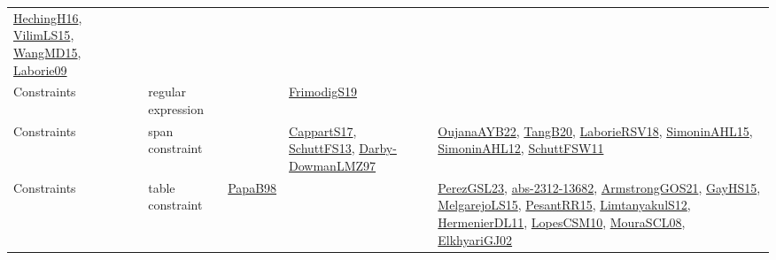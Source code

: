{\begin{longtable}{lp{3cm}>{\raggedright}p{6cm}>{\raggedright}p{6cm}p{8cm}}
\href{papers/HechingH16.pdf}{HechingH16}\cite{HechingH16}, \href{papers/VilimLS15.pdf}{VilimLS15}\cite{VilimLS15}, \href{articles/WangMD15.pdf}{WangMD15}\cite{WangMD15}, \href{papers/Laborie09.pdf}{Laborie09}\cite{Laborie09}\\
Constraints & regular expression &  & \href{papers/FrimodigS19.pdf}{FrimodigS19}\cite{FrimodigS19} & \\
Constraints & span constraint &  & \href{papers/CappartS17.pdf}{CappartS17}\cite{CappartS17}, \href{papers/SchuttFS13.pdf}{SchuttFS13}\cite{SchuttFS13}, \href{articles/Darby-DowmanLMZ97.pdf}{Darby-DowmanLMZ97}\cite{Darby-DowmanLMZ97} & \href{papers/OujanaAYB22.pdf}{OujanaAYB22}\cite{OujanaAYB22}, \href{papers/TangB20.pdf}{TangB20}\cite{TangB20}, \href{articles/LaborieRSV18.pdf}{LaborieRSV18}\cite{LaborieRSV18}, \href{articles/SimoninAHL15.pdf}{SimoninAHL15}\cite{SimoninAHL15}, \href{papers/SimoninAHL12.pdf}{SimoninAHL12}\cite{SimoninAHL12}, \href{articles/SchuttFSW11.pdf}{SchuttFSW11}\cite{SchuttFSW11}\\
Constraints & table constraint & \href{articles/PapaB98.pdf}{PapaB98}\cite{PapaB98} &  & \href{papers/PerezGSL23.pdf}{PerezGSL23}\cite{PerezGSL23}, \href{articles/abs-2312-13682.pdf}{abs-2312-13682}\cite{abs-2312-13682}, \href{papers/ArmstrongGOS21.pdf}{ArmstrongGOS21}\cite{ArmstrongGOS21}, \href{papers/GayHS15.pdf}{GayHS15}\cite{GayHS15}, \href{papers/MelgarejoLS15.pdf}{MelgarejoLS15}\cite{MelgarejoLS15}, \href{papers/PesantRR15.pdf}{PesantRR15}\cite{PesantRR15}, \href{articles/LimtanyakulS12.pdf}{LimtanyakulS12}\cite{LimtanyakulS12}, \href{papers/HermenierDL11.pdf}{HermenierDL11}\cite{HermenierDL11}, \href{articles/LopesCSM10.pdf}{LopesCSM10}\cite{LopesCSM10}, \href{papers/MouraSCL08.pdf}{MouraSCL08}\cite{MouraSCL08}, \href{papers/ElkhyariGJ02.pdf}{ElkhyariGJ02}\cite{ElkhyariGJ02}\\

\end{longtable}}
